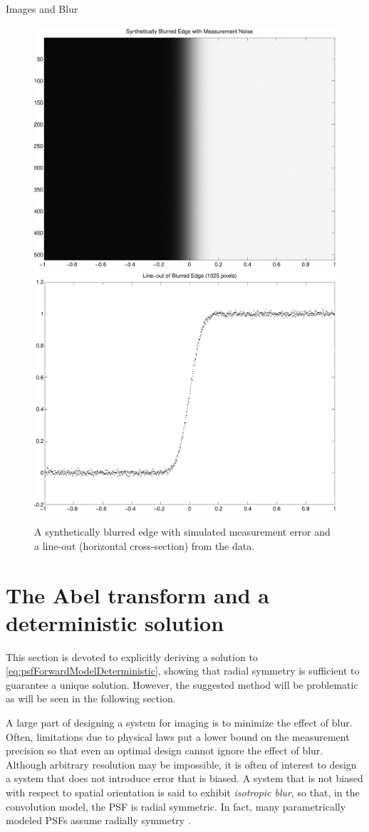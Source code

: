 \begin{chapter}{Images and Blur}
\begin{figure}
\begin{center}
  \includegraphics[width=.45\textwidth]{figures/blurredEdgeData.pdf}
  \includegraphics[width=.45\textwidth]{figures/psfLineoutData.pdf}
  \caption{A synthetically blurred edge with simulated measurement error and a line-out (horizontal cross-section) from the data.} \label{fig:edgeData}
\end{center}
\end{figure}
  
\section{The Abel transform and a deterministic solution}

  This section is devoted to explicitly deriving a solution to \eqref{eq:psfForwardModelDeterministic}, showing that radial symmetry is sufficient to guarantee a unique solution.
  However, the suggested method will be problematic as will be seen in the following section.

  A large part of designing a system for imaging is to minimize the effect of blur.
  Often, limitations due to physical laws put a lower bound on the measurement precision so that even an optimal design cannot ignore the effect of blur.
  Although arbitrary resolution may be impossible, it is often of interest to design a system that does not introduce error that is biased.
  A system that is not biased with respect to spatial orientation is said to exhibit \emph{isotropic blur}, so that, in the convolution model, the PSF is radial symmetric.
  In fact, many parametrically modeled PSFs assume radially symmetry \citep{doering1992,jain1989,kundur1996blind,watson1993}.  


\end{chapter}
